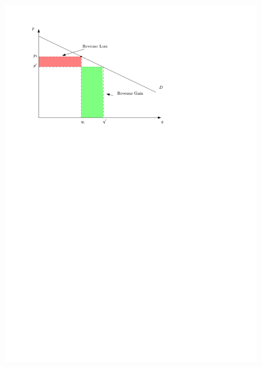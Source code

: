 \documentclass{article}
\begin{document}
\begin{center}
    \begin{figure}[H]
        \centering
        \includegraphics[]{./figs/monopoly} 
    \end{figure}    
\end{center}


\end{document}
